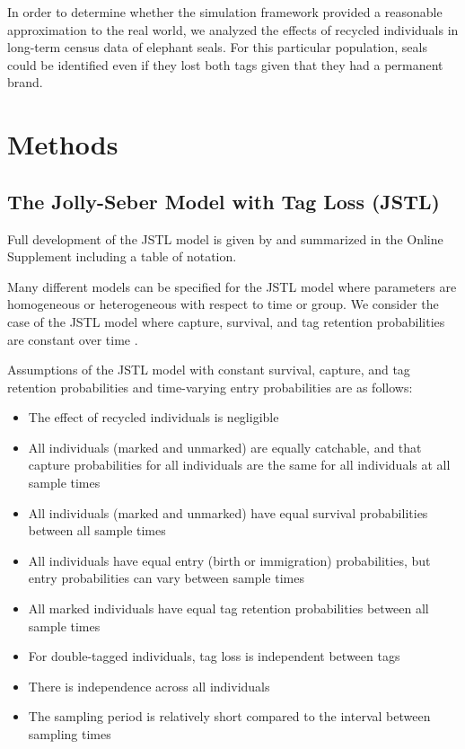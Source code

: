 \documentclass[]{article}
\providecommand{\tightlist}{%
  \setlength{\itemsep}{0pt}\setlength{\parskip}{0pt}}
\begin{document}
In order to determine whether the simulation framework provided a
reasonable approximation to the real world, we analyzed the effects of
recycled individuals in long-term census data of elephant seals. For
this particular population, seals could be identified even if they lost
both tags given that they had a permanent brand.

\section{Methods}\label{methods}

\subsection{The Jolly-Seber Model with Tag Loss
(JSTL)}\label{the-jolly-seber-model-with-tag-loss-jstl}

Full development of the JSTL model is given by \citep{Cowen:2006} and summarized in the Online Supplement including a table of notation.  

Many different models can be specified for the JSTL model where
parameters are homogeneous or heterogeneous with respect to time or
group. We consider the case of the JSTL model where capture, survival,
and tag retention probabilities are constant over time \citep{Cowen:2006}.

Assumptions of the JSTL model with constant survival, capture, and tag
retention probabilities and time-varying entry probabilities are as
follows:

\begin{itemize}
\tightlist
\item
  The effect of recycled individuals is negligible
\item
  All individuals (marked and unmarked) are equally catchable, and that
  capture probabilities for all individuals are the same for all
  individuals at all sample times
\item
  All individuals (marked and unmarked) have equal survival
  probabilities between all sample times
\item
  All individuals have equal entry (birth or immigration) probabilities,
  but entry probabilities can vary between sample times
\item
  All marked individuals have equal tag retention probabilities between
  all sample times
\item
  For double-tagged individuals, tag loss is independent between tags
\item
  There is independence across all individuals
\item
  The sampling period is relatively short compared to the interval
  between sampling times
\end{itemize}
\end{document}
